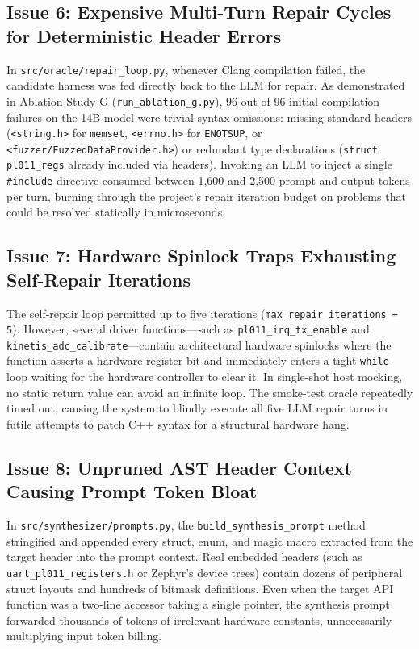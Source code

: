 \documentclass[11pt,a4paper]{article}
\begin{document}
\subsection{Issue 6: Expensive Multi-Turn Repair Cycles for Deterministic Header Errors}
In \texttt{src/oracle/repair\_loop.py}, whenever Clang compilation failed, the candidate harness was fed directly back to the LLM for repair. As demonstrated in Ablation Study G (\texttt{run\_ablation\_g.py}), 96 out of 96 initial compilation failures on the 14B model were trivial syntax omissions: missing standard headers (\texttt{<string.h>} for \texttt{memset}, \texttt{<errno.h>} for \texttt{ENOTSUP}, or \texttt{<fuzzer/FuzzedDataProvider.h>}) or redundant type declarations (\texttt{struct pl011\_regs} already included via headers). Invoking an LLM to inject a single \texttt{\#include} directive consumed between 1,600 and 2,500 prompt and output tokens per turn, burning through the project's repair iteration budget on problems that could be resolved statically in microseconds.

\subsection{Issue 7: Hardware Spinlock Traps Exhausting Self-Repair Iterations}
The self-repair loop permitted up to five iterations (\texttt{max\_repair\_iterations = 5}). However, several driver functions—such as \texttt{pl011\_irq\_tx\_enable} and \texttt{kinetis\_adc\_calibrate}—contain architectural hardware spinlocks where the function asserts a hardware register bit and immediately enters a tight \texttt{while} loop waiting for the hardware controller to clear it. In single-shot host mocking, no static return value can avoid an infinite loop. The smoke-test oracle repeatedly timed out, causing the system to blindly execute all five LLM repair turns in futile attempts to patch C++ syntax for a structural hardware hang.

\subsection{Issue 8: Unpruned AST Header Context Causing Prompt Token Bloat}
In \texttt{src/synthesizer/prompts.py}, the \texttt{build\_synthesis\_prompt} method stringified and appended every struct, enum, and magic macro extracted from the target header into the prompt context. Real embedded headers (such as \texttt{uart\_pl011\_registers.h} or Zephyr's device trees) contain dozens of peripheral struct layouts and hundreds of bitmask definitions. Even when the target API function was a two-line accessor taking a single pointer, the synthesis prompt forwarded thousands of tokens of irrelevant hardware constants, unnecessarily multiplying input token billing.
\end{document}
